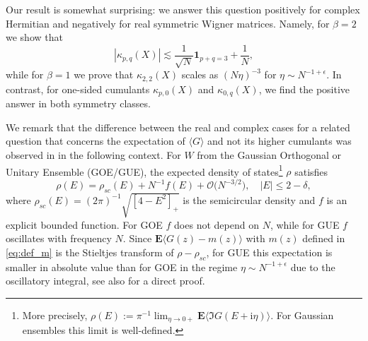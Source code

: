 \documentclass[10pt]{amsart}
\numberwithin{equation}{section}
\newcommand{\E}{\mathbf{E}}
\newcommand{\ii}{\mathrm{i}}
\begin{document}
\smallskip

\noindent Our result is somewhat surprising: we answer this question positively for complex Hermitian and negatively for real symmetric Wigner matrices. Namely, for $\beta=2$ we show that
\begin{equation}
\left\vert\kappa_{p,q}\left(X\right)\right\vert \lesssim \frac{1}{\sqrt{N}}\bm{1}_{p+q=3} + \frac{1}{N},
\label{eq:main_pq_intro}
\end{equation} 
while for $\beta=1$ we prove that $\kappa_{2,2}(X)$ scales as $(N\eta)^{-3}$ for $\eta\sim N^{-1+\epsilon}$. In contrast, for one-sided cumulants $\kappa_{p,0}(X)$ and $\kappa_{0,q}(X)$, we find the positive answer in both symmetry classes.

We remark that the difference between the real and complex cases for a  related question that concerns the expectation of $\langle  G \rangle$ and  not its higher cumulants was observed in \cite{Shamis} in the following context. For $W$ from the Gaussian Orthogonal or Unitary Ensemble (GOE/GUE), the expected density of states\footnote{More precisely, $\rho(E):= \pi^{-1} \lim_{\eta\to 0+} \E \langle \Im G(E+\ii \eta)\rangle$. For Gaussian ensembles this limit is well-defined. } $\rho$ satisfies
\begin{equation}
\rho(E) =\rho_{sc}(E) + N^{-1}f(E) + \mathcal{O}\big(N^{-3/2}\big),\quad |E|\le 2-\delta,
\end{equation}
where $\rho_{sc}(E)=(2\pi)^{-1}\sqrt{[4-E^2]_+}$ is the semicircular density and $f$ is an explicit bounded  function. For GOE $f$ does not depend on $N$, while for GUE $f$ oscillates with frequency $N$. Since $\E\langle G(z)-m(z)\rangle$ with $m(z)$ defined in \eqref{eq:def_m} is the Stieltjes transform of $\rho-\rho_{sc}$, for GUE this expectation is smaller in absolute value than for GOE in the regime $\eta\sim N^{-1+\epsilon}$ due to the oscillatory integral, see also \cite[Lemma~4.4]{Knowles20} for a direct proof. 
\end{document}
